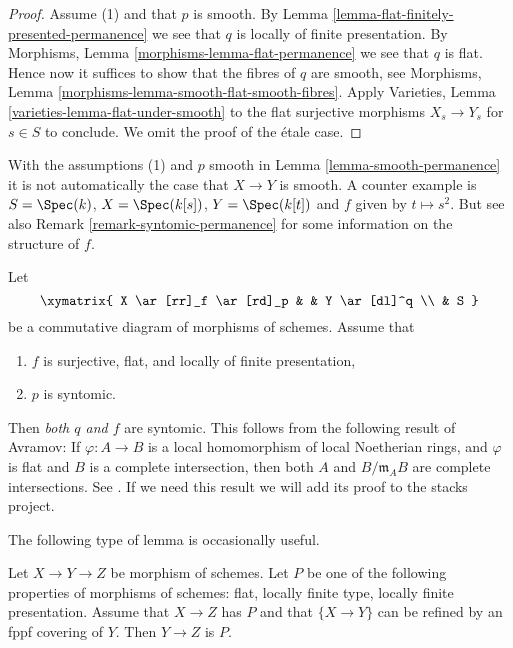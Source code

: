 \begin{proof}
Assume (1) and that $p$ is smooth. By
Lemma \ref{lemma-flat-finitely-presented-permanence}
we see that $q$ is locally of finite presentation.
By
Morphisms, Lemma \ref{morphisms-lemma-flat-permanence}
we see that $q$ is flat.
Hence now it suffices to show that the fibres of $q$ are smooth, see
Morphisms, Lemma \ref{morphisms-lemma-smooth-flat-smooth-fibres}.
Apply
Varieties, Lemma \ref{varieties-lemma-flat-under-smooth}
to the flat surjective morphisms $X_s \to Y_s$ for $s \in S$ to
conclude. We omit the proof of the \'etale case.
\end{proof}

\begin{remark}
\label{remark-smooth-permanence}
With the assumptions (1) and $p$ smooth in
Lemma \ref{lemma-smooth-permanence}
it is not automatically the case that $X \to Y$ is smooth.
A counter example is $S = \Spec(k)$, $X = \Spec(k[s])$,
$Y = \Spec(k[t])$ and $f$ given by $t \mapsto s^2$.
But see also
Remark \ref{remark-syntomic-permanence}
for some information on the structure of $f$.
\end{remark}

\begin{remark}
\label{remark-syntomic-permanence}
Let
$$
\xymatrix{
X \ar[rr]_f \ar[rd]_p & &
Y \ar[dl]^q \\
& S
}
$$
be a commutative diagram of morphisms of schemes. Assume that
\begin{enumerate}
\item $f$ is surjective, flat, and locally of finite presentation,
\item $p$ is syntomic.
\end{enumerate}
Then {\it both $q$ and $f$} are syntomic. This follows from the following
result of Avramov: If $\varphi : A \to B$ is a local homomorphism
of local Noetherian rings, and $\varphi$ is flat and $B$ is a complete
intersection, then both $A$ and $B/\mathfrak m_AB$ are complete intersections.
See \cite{Avramov}. If we need this result we will add its proof to the
stacks project.
\end{remark}

\noindent
The following type of lemma is occasionally useful.

\begin{lemma}
\label{lemma-curiosity}
Let $X \to Y \to Z$ be morphism of schemes.
Let $P$ be one of the following properties of morphisms of schemes:
flat, locally finite type, locally finite presentation.
Assume that $X \to Z$ has $P$ and that $\{X \to Y\}$
can be refined by an fppf covering of $Y$. Then $Y \to Z$ is $P$.
\end{lemma}

